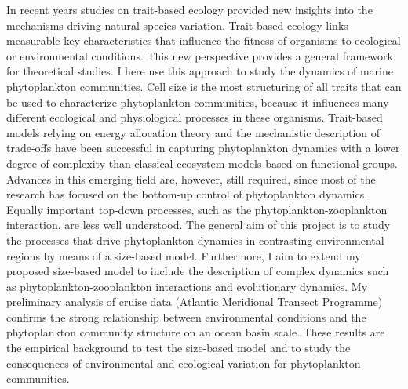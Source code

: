 \begin{titlepage}
In recent years studies on trait-based ecology provided new insights into the mechanisms driving natural species variation. Trait-based ecology links measurable key characteristics that influence the fitness of organisms to ecological or environmental conditions. This new perspective provides a general framework for theoretical studies. I here use this approach to study the dynamics of marine phytoplankton communities. Cell size is the most structuring of all traits that can be used to characterize phytoplankton communities, because it influences many different ecological and physiological processes in these organisms. Trait-based models relying on energy allocation theory and the mechanistic description of trade-offs have been successful in capturing phytoplankton dynamics with a lower degree of complexity than classical ecosystem models based on functional groups. Advances in this emerging field are, however, still required, since most of the research has focused on the bottom-up control of phytoplankton dynamics. Equally important top-down processes, such as the phytoplankton-zooplankton interaction, are less well understood. 
The general aim of this project is to study the processes that drive phytoplankton dynamics in contrasting environmental regions by means of a size-based model. Furthermore, I aim to extend my proposed size-based model to include the description of complex dynamics such as phytoplankton-zooplankton interactions and evolutionary dynamics. My preliminary analysis of cruise data (Atlantic Meridional Transect Programme) confirms the strong relationship between environmental conditions and the phytoplankton community structure on an ocean basin scale. These results are the empirical background to test the size-based model and to study the consequences of environmental and ecological variation for phytoplankton communities.

\end{titlepage}